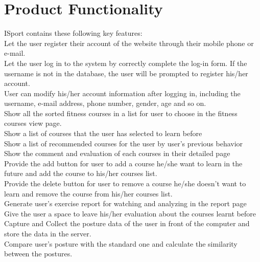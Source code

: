 \documentclass[16pt]{scrreprt}
\begin{document}
\section{Product Functionality}

ISport contains these following key features:\\
Let the user register their account of the website through their mobile phone or e-mail.\\

 
Let the user log in to the system by correctly complete the log-in form. If the username is not in the database, the user will be prompted to register his/her account.\\

 
User can modify his/her account information after logging in, including the username, e-mail address, phone number, gender, age and so on.\\

 
Show all the sorted fitness courses in a list for user to choose in the fitness courses view page. \\

 
Show a list of courses that the user has selected to learn before\\

 
Show a list of recommended courses for the user by user's previous behavior \\

 
Show the comment and evaluation of each courses in their detailed page\\

 
Provide the add button for user to add a course he/she want to learn in the future and add the course to his/her courses list.\\

 
Provide the delete button for user to remove a course he/she doesn't want to learn and remove the course from his/her courses list.\\


Generate user's exercise report for watching and analyzing in the report page\\
 
Give the user a space to leave his/her evaluation about the courses learnt before\\

Capture and Collect the posture data of the user in front of the computer and store the data in the server.\\


Compare user's posture with the standard one and calculate the similarity between the postures.\\
\end{document}
